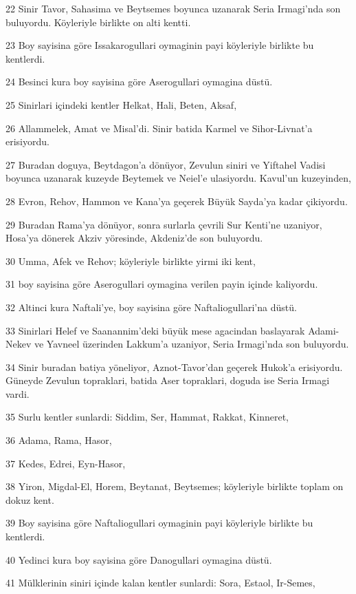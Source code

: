 \par 22 Sinir Tavor, Sahasima ve Beytsemes boyunca uzanarak Seria Irmagi'nda son buluyordu. Köyleriyle birlikte on alti kentti.
\par 23 Boy sayisina göre Issakarogullari oymaginin payi köyleriyle birlikte bu kentlerdi.
\par 24 Besinci kura boy sayisina göre Aserogullari oymagina düstü.
\par 25 Sinirlari içindeki kentler Helkat, Hali, Beten, Aksaf,
\par 26 Allammelek, Amat ve Misal'di. Sinir batida Karmel ve Sihor-Livnat'a erisiyordu.
\par 27 Buradan doguya, Beytdagon'a dönüyor, Zevulun siniri ve Yiftahel Vadisi boyunca uzanarak kuzeyde Beytemek ve Neiel'e ulasiyordu. Kavul'un kuzeyinden,
\par 28 Evron, Rehov, Hammon ve Kana'ya geçerek Büyük Sayda'ya kadar çikiyordu.
\par 29 Buradan Rama'ya dönüyor, sonra surlarla çevrili Sur Kenti'ne uzaniyor, Hosa'ya dönerek Akziv yöresinde, Akdeniz'de son buluyordu.
\par 30 Umma, Afek ve Rehov; köyleriyle birlikte yirmi iki kent,
\par 31 boy sayisina göre Aserogullari oymagina verilen payin içinde kaliyordu.
\par 32 Altinci kura Naftali'ye, boy sayisina göre Naftaliogullari'na düstü.
\par 33 Sinirlari Helef ve Saanannim'deki büyük mese agacindan baslayarak Adami-Nekev ve Yavneel üzerinden Lakkum'a uzaniyor, Seria Irmagi'nda son buluyordu.
\par 34 Sinir buradan batiya yöneliyor, Aznot-Tavor'dan geçerek Hukok'a erisiyordu. Güneyde Zevulun topraklari, batida Aser topraklari, doguda ise Seria Irmagi vardi.
\par 35 Surlu kentler sunlardi: Siddim, Ser, Hammat, Rakkat, Kinneret,
\par 36 Adama, Rama, Hasor,
\par 37 Kedes, Edrei, Eyn-Hasor,
\par 38 Yiron, Migdal-El, Horem, Beytanat, Beytsemes; köyleriyle birlikte toplam on dokuz kent.
\par 39 Boy sayisina göre Naftaliogullari oymaginin payi köyleriyle birlikte bu kentlerdi.
\par 40 Yedinci kura boy sayisina göre Danogullari oymagina düstü.
\par 41 Mülklerinin siniri içinde kalan kentler sunlardi: Sora, Estaol, Ir-Semes,
